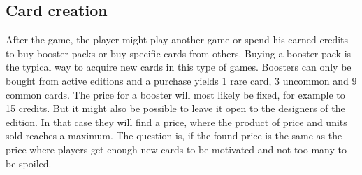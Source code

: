 \documentclass{article}
\begin{document}
\subsection{Card creation}
%
After the game, the player might play another game or spend his earned credits to buy booster packs or buy specific cards from others. Buying a booster pack is the typical way to acquire new cards in this type of games. Boosters can only be bought from active editions and a purchase yields 1 rare card, 3 uncommon and 9 common cards. The price for a booster will most likely be fixed, for example to 15 credits. But it might also be possible to leave it open to the designers of the edition. In that case they will find a price, where the product of price and units sold reaches a maximum. The question is, if the found price is the same as the price where players get enough new cards to be motivated and not too many to be spoiled.
%
\newline \newline
%
\end{document}

